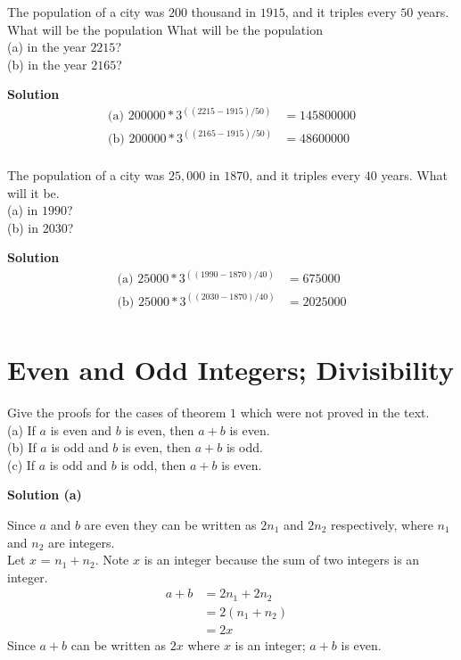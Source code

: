 \documentclass[6pt]{article}
\begin{document}
\begin{tcolorbox}[title=Problem 32, breakable]
The population of a city was $200$ thousand in $1915$, and it triples every
$50$ years. What will be the population What will be the population \\
(a) in the year $2215$? \\
(b) in the year $2165$? \\
\end{tcolorbox}

\textbf{Solution}
\begin{align*}
\text{(a) } 200000 * 3^{((2215 - 1915) / 50)} &= 145800000 \\
\text{(b) } 200000 * 3^{((2165 - 1915) / 50)} &= 48600000 \\
\end{align*}

\begin{tcolorbox}[title=Problem 33, breakable]
The population of a city was $25,000$ in $1870$, and it triples every $40$ years.
What will it be. \\
(a) in $1990$? \\
(b) in $2030$? \\
\end{tcolorbox}

\textbf{Solution}
\begin{align*}
\text{(a) } 25000 * 3^{((1990 - 1870) / 40)} &= 675000 \\
\text{(b) } 25000 * 3^{((2030 - 1870) / 40)} &= 2025000 \\
\end{align*}

\section{Even and Odd Integers; Divisibility}

\begin{tcolorbox}[title=Problem 1, breakable]
Give the proofs for the cases of theorem $1$ which were not proved in the text. \\
(a) If $a$ is even and $b$ is even, then $a + b$ is even. \\
(b) If $a$ is odd and $b$ is even, then $a + b$ is odd. \\
(c) If $a$ is odd and $b$ is odd, then $a + b$ is even. 
\end{tcolorbox}

\textbf{Solution (a)}

Since $a$ and $b$ are even they can be written as $2n_1$ and $2n_2$ respectively,
where $n_1$ and $n_2$ are integers. \\
Let $x$ = $n_1 + n_2$. Note $x$ is an integer because the sum of two integers is an integer. \\
\begin{align*}
a + b &= 2n_1 + 2n_2 & \\
&= 2(n_1 + n_2) & \\
&= 2x 
\end{align*}
Since $a + b$ can be written as $2x$ where $x$ is an integer; $a + b$ is even.
\end{document}
